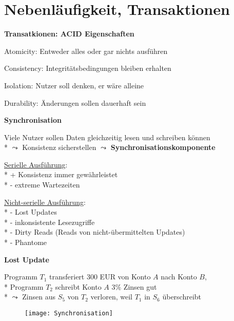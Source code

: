 \section{Nebenläufigkeit, Transaktionen}
\label{sec:parallel}

\textbf{Transatkionen: ACID Eigenschaften}
\begin{items}
	\item Atomicity: Entweder alles oder gar nichts ausführen
	\item Consistency: Integritätsbedingungen bleiben erhalten
	\item Isolation: Nutzer soll denken, er wäre alleine
	\item Durability: Änderungen sollen dauerhaft sein
\end{items}

\textbf{Synchronisation}
\begin{items}
	\item Viele Nutzer sollen Daten gleichzeitig lesen und schreiben können
		\\*
		\( \leadsto \) Konsistenz sicherstellen \( \leadsto \) \textbf{Synchronisationskomponente}
	\item \underline{Serielle Ausführung}: 
		\\*
		+ Konsistenz immer gewährleistet 
		\\*
		- extreme Wartezeiten
	\item \underline{Nicht-serielle Ausführung}:
		\\*
		- Lost Updates
		\\*
		- inkonsistente Lesezugriffe
		\\*
		- Dirty Reads (Reads von nicht-übermittelten Updates)
		\\*
		- Phantome
\end{items}

\textbf{Lost Update}
\begin{items}
	\item Programm \( T_1 \) transferiert 300 EUR von Konto \( A \) nach Konto \( B \),
		\\*
		Programm \( T_2 \) schreibt Konto \( A \) \( 3 \% \) Zinsen gut
		\\*
		\( \leadsto \) Zinsen aus \( S_5 \) von \( T_2 \) verloren, weil \( T_1 \) in \( S_6 \) überschreibt
\end{items}
\begin{figure}[H]\centering\label{Synchronisation}\texttt{[image: Synchronisation]}\end{figure}

